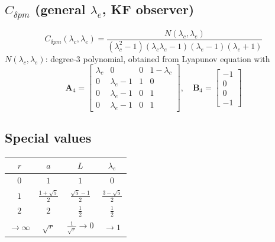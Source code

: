 \documentclass[11pt]{article}
\begin{document}
\subsection*{$C_{\delta pm}$ (general $\lambda_e$, KF observer)}
\begin{equation}
C_{\delta pm}(\lambda_c, \lambda_e) = \frac{N(\lambda_c, \lambda_e)}{(\lambda_c^2-1)(\lambda_c\lambda_e-1)(\lambda_e-1)(\lambda_e+1)}
\end{equation}
$N(\lambda_c, \lambda_e)$: degree-3 polynomial, obtained from Lyapunov equation with
\begin{equation}
\mathbf{A}_4 = \begin{bmatrix}
\lambda_c & 0 & 0 & 1\!-\!\lambda_c \\
0 & \lambda_e\!-\!1 & 1 & 0 \\
0 & \lambda_e\!-\!1 & 0 & 1 \\
0 & \lambda_e\!-\!1 & 0 & 1
\end{bmatrix}, \quad
\mathbf{B}_4 = \begin{bmatrix}-1\\0\\0\\-1\end{bmatrix}
\end{equation}

\subsection*{Special values}

\begin{center}
\begin{tabular}{c|c|c|c}
$r$ & $a$ & $L$ & $\lambda_e$ \\
\hline
$0$ & $1$ & $1$ & $0$ \\
$1$ & $\frac{1+\sqrt{5}}{2}$ & $\frac{\sqrt{5}-1}{2}$ & $\frac{3-\sqrt{5}}{2}$ \\
$2$ & $2$ & $\frac{1}{2}$ & $\frac{1}{2}$ \\
$\to\infty$ & $\sqrt{r}$ & $\frac{1}{\sqrt{r}}\to 0$ & $\to 1$
\end{tabular}
\end{center}
\end{document}
